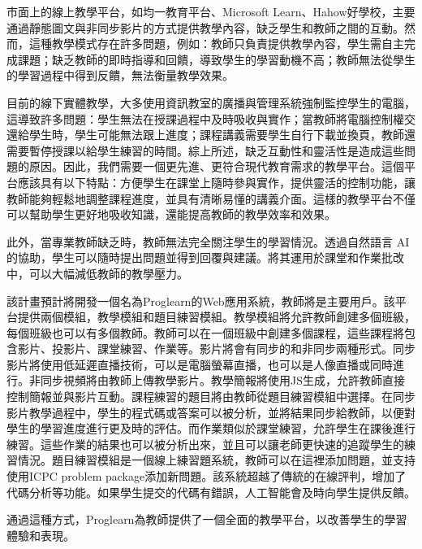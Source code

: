 \documentclass[12pt]{article}
\begin{document}
\begin{enumerate}
    \par 市面上的線上教學平台，如均一教育平台、Microsoft Learn、Hahow好學校，主要通過靜態圖文與非同步影片的方式提供教學內容，缺乏學生和教師之間的互動。然而，這種教學模式存在許多問題，例如：教師只負責提供教學內容，學生需自主完成課題；缺乏教師的即時指導和回饋，導致學生的學習動機不高；教師無法從學生的學習過程中得到反饋，無法衡量教學效果\cite{ref4}。
    \par 目前的線下實體教學，大多使用資訊教室的廣播與管理系統強制監控學生的電腦，這導致許多問題：學生無法在授課過程中及時吸收與實作；當教師將電腦控制權交還給學生時，學生可能無法跟上進度；課程講義需要學生自行下載並換頁，教師還需要暫停授課以給學生練習的時間。綜上所述，缺乏互動性和靈活性是造成這些問題的原因。因此，我們需要一個更先進、更符合現代教育需求的教學平台。這個平台應該具有以下特點：方便學生在課堂上隨時參與實作，提供靈活的控制功能，讓教師能夠輕鬆地調整課程進度，並具有清晰易懂的講義介面。這樣的教學平台不僅可以幫助學生更好地吸收知識，還能提高教師的教學效率和效果。
    \par 此外，當專業教師缺乏時，教師無法完全關注學生的學習情況。透過自然語言 AI 的協助，學生可以隨時提出問題並得到回覆與建議。將其運用於課堂和作業批改中，可以大幅減低教師的教學壓力。
    \par 該計畫預計將開發一個名為Proglearn的Web應用系統，教師將是主要用戶。該平台提供兩個模組，教學模組和題目練習模組。教學模組將允許教師創建多個班級，每個班級也可以有多個教師。教師可以在一個班級中創建多個課程，這些課程將包含影片、投影片、課堂練習、作業等。影片將會有同步的和非同步兩種形式。同步影片將使用低延遲直播技術，可以是電腦螢幕直播，也可以是人像直播或同時進行。非同步視頻將由教師上傳教學影片。教學簡報將使用JS生成，允許教師直接控制簡報並與影片互動。課程練習的題目將由教師從題目練習模組中選擇。在同步影片教學過程中，學生的程式碼或答案可以被分析，並將結果同步給教師，以便對學生的學習進度進行更及時的評估。而作業類似於課堂練習，允許學生在課後進行練習。這些作業的結果也可以被分析出來，並且可以讓老師更快速的追蹤學生的練習情況。題目練習模組是一個線上練習題系統，教師可以在這裡添加問題，並支持使用ICPC problem package添加新問題。該系統超越了傳統的在線評判，增加了代碼分析等功能。如果學生提交的代碼有錯誤，人工智能會及時向學生提供反饋。
    \par 通過這種方式，Proglearn為教師提供了一個全面的教學平台，以改善學生的學習體驗和表現。


\end{enumerate}
\end{document}
